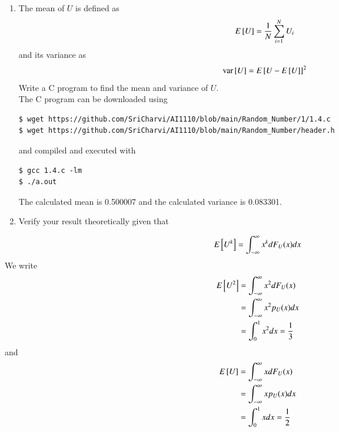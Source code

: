 \documentclass[journal,12pt,twocolumn]{IEEEtran}
\renewcommand\thesection{\arabic{section}}
\begin{document}
\begin{enumerate}[label=\thesection.\arabic*
,ref=\thesection.\theenumi]
\begin{enumerate}
\begin{align}
					F_U(x) = \int_{0}^{x}du = x
					\label{eq:cdf-uni}
				\end{align}
			\item $x \geq 1$: Put $x = 1$ in \eqref{eq:cdf-uni} as $U$ is uniform in [0, 1] to get $F_U(x) = 1$.
		\end{enumerate}
Therefore,
		\begin{align}
			F_U(x) = 
			\begin{cases}
				0 & x < 0 \\
				x & 0 \leq x < 1 \\
				1 & x \geq 1
			\end{cases}
			\label{eq:cdf-ans}
		\end{align}
This is verified in Figure \eqref{fig:uni_cdf}
\item
The mean of $U$ is defined as
%
\begin{equation}
E{}\left[U\right] = \frac{1}{N}\sum_{i=1}^{N}U_i
	\label{eq:mean-form}
\end{equation}
%
and its variance as
%
\begin{equation}
\text{var}{}\left[U\right] = E{}\left[U- E{}\left[U\right]\right]^2 
	\label{eq:var-form}
\end{equation}
Write a C program to  find the mean and variance of $U$.\\
\solution
The C program can be downloaded using
\begin{lstlisting}
$ wget https://github.com/SriCharvi/AI1110/blob/main/Random_Number/1/1.4.c
$ wget https://github.com/SriCharvi/AI1110/blob/main/Random_Number/header.h
\end{lstlisting}
and compiled and executed with
\begin{lstlisting}
$ gcc 1.4.c -lm
$ ./a.out
\end{lstlisting}
The calculated mean is 0.500007 and the calculated variance is 0.083301.
\item Verify your result theoretically given that
\end{enumerate}
%
\begin{equation}
E{}\left[U^k\right] = \int_{-\infty}^{\infty}x^kdF_{U}(x)dx
\end{equation}
\solution
We write
\begin{align}
	E{}\left[U^2\right] &= \int_{-\infty}^{\infty}x^2dF_U(x) \\
	&= \int_{-\infty}^{\infty}x^2p_U(x)dx \\
	&= \int_{0}^{1}x^2dx = \frac{1}{3}
\end{align}
and
\begin{align}
	E{}\left[U\right] &= \int_{-\infty}^{\infty}xdF_U(x) \\
	&= \int_{-\infty}^{\infty}xp_U(x)dx \\
	&= \int_{0}^{1}xdx = \frac{1}{2}
\end{align}
\end{document}
